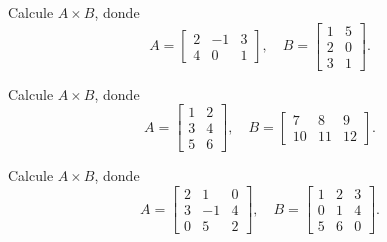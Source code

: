 \begin{ejercicio}
Calcule $A \times B$, donde
\[
A=\begin{bmatrix} 2 & -1 & 3 \\ 4 & 0 & 1 \end{bmatrix}, \quad
B=\begin{bmatrix} 1 & 5 \\ 2 & 0 \\ 3 & 1 \end{bmatrix}.
\]
\end{ejercicio}
\muestraSolucion{
\[
AB=\begin{bmatrix} 9 & 13 \\ 7 & 21 \end{bmatrix}.
\]
}

\begin{ejercicio}
Calcule $A \times B$, donde
\[
A=\begin{bmatrix} 1 & 2 \\ 3 & 4 \\ 5 & 6 \end{bmatrix}, \quad
B=\begin{bmatrix} 7 & 8 & 9 \\ 10 & 11 & 12 \end{bmatrix}.
\]
\end{ejercicio}
\muestraSolucion{
\[
AB=\begin{bmatrix} 27 & 30 & 33 \\ 61 & 68 & 75 \\ 95 & 106 & 117 \end{bmatrix}.
\]
}

\begin{ejercicio}
Calcule $A \times B$, donde
\[
A=\begin{bmatrix} 2 & 1 & 0 \\ 3 & -1 & 4 \\ 0 & 5 & 2 \end{bmatrix}, \quad
B=\begin{bmatrix} 1 & 2 & 3 \\ 0 & 1 & 4 \\ 5 & 6 & 0 \end{bmatrix}.
\]
\end{ejercicio}
\muestraSolucion{
\[
AB=\begin{bmatrix} 2 & 5 & 10 \\ 23 & 29 & 5 \\ 10 & 17 & 20 \end{bmatrix}.
\]
}

